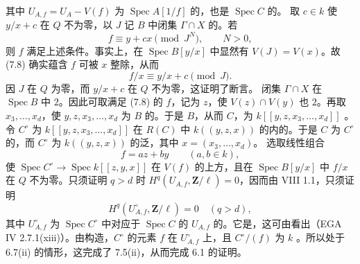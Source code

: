 其中 $U_{A,f}=U_A-V(f)$ 为 $\operatorname{Spec}A[1/f]$ 的，也是 $\operatorname{Spec}C$ 的。
取 $c\in k$ 使 $y/x+c$ 在 $Q$ 不为零，以 $J$ 记 $B$ 中闭集 $\Gamma\cap X$ 的。若
\[f\equiv y+cx\pmod{J^N},\qquad N>0,\tag{7.8}\]
则 $f$ 满足上述条件。事实上，在 $\operatorname{Spec}B[y/x]$ 中显然有 $V(J)=V(x)$。故 (7.8) 确实蕴含 $f$ 可被 $x$ 整除，从而
\[f/x\equiv y/x+c\pmod J.\]
因 $J$ 在 $Q$ 为零，而 $y/x+c$ 在 $Q$ 不为零，这证明了断言。
闭集 $\Gamma\cap X$ 在 $\operatorname{Spec}B$ 中 $2$。因此可取满足 (7.8) 的 $f$，记为 $z$，使 $V(z)\cap V(y)$ 也 $2$。再取 $x_3,\ldots,x_d$，使 $y,z,x_3,\ldots,x_d$ 为 $B$ 的。于是 $B$，从而 $C$，为 $k[[y,z,x_3,\ldots,x_d]]$ 。
令 $C^\circ$ 为 $k[[y,z,x_3,\ldots,x_d]]$ 在 $R(C)$ 中 $k((y,z,x))$ 的内的。于是 $C$ 为 $C^\circ$ 的，而 $C^\circ$ 为 $k((y,z,x))$ 的泛，其中 $x=(x_3,\ldots,x_d)$。
选取线性组合
\[f=az+by\qquad(a,b\in k),\]
使 $\operatorname{Spec}C^\circ\to\operatorname{Spec}k[[z,y,x]]$ 在 $V(f)$ 的上方，且在 $\operatorname{Spec}B[y/x]$ 中 $f/x$ 在 $Q$ 不为零。只须证明 $q>d$ 时 $H^q(U_{A,f},\mathbf Z/\ell)=0$，因而由 VIII 1.1，只须证明
\[H^q(U^\circ_{A,f},\mathbf Z/\ell)=0\quad(q>d),\]
其中 $U^\circ_{A,f}$ 为 $\operatorname{Spec}C^\circ$ 中对应于 $\operatorname{Spec}C$ 的 $U_{A,f}$ 的。它是，这可由看出（EGA IV 2.7.1(xiii)）。由构造，$C^\circ$ 的元素 $f$ 在 $U^\circ_{A,f}$ 上，且 $C^\circ/(f)$ 为 $k$ 。所以处于 6.7(ii) 的情形，这完成了 7.5(ii)，从而完成 6.1 的证明。
